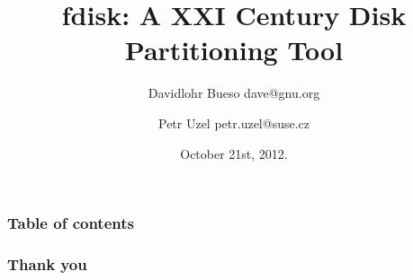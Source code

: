 \documentclass{beamer}
\begin{document}
\title{fdisk: A XXI Century Disk Partitioning Tool}
\author[]{Davidlohr Bueso dave@gnu.org \and Petr Uzel petr.uzel@suse.cz}
\date{October 21st, 2012.}

\begin{frame}
  \titlepage
\end{frame}

\begin{frame}\frametitle{Table of contents}\tableofcontents
\end{frame}






\begin{frame}\frametitle{Thank you}
\end{frame}
\end{document}

